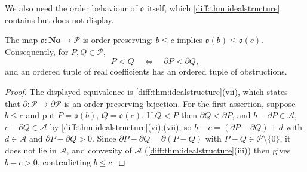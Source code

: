 \documentclass[11pt,letterpaper]{article}
\numberwithin{equation}{section}
\theoremstyle{definition}
\theoremstyle{remark}
\newcommand{\No}{\mathbf{No}}
\newcommand{\der}{\partial}
\newcommand{\Pcl}{\mathcal P}
\newcommand{\Acl}{\mathcal A}
\newcommand{\Obs}{\mathfrak o}
\begin{document}
We also need the order behaviour of $\Obs$ itself, which
\cref{diff:thm:idealstructure} contains but does not display.

\begin{corollary}
\label{diff:cor:obsorder}
The map $\Obs:\No\to\Pcl$ is order preserving: $b\leq c$ implies
$\Obs(b)\leq\Obs(c)$. Consequently, for $P,Q\in\Pcl$,
\[
 P<Q\quad\Longleftrightarrow\quad\der P<\der Q ,
\]
and an ordered tuple of real coefficients has an ordered tuple of
obstructions.
\end{corollary}
\begin{proof}
The displayed equivalence is \cref{diff:thm:idealstructure}(vii), which states
that $\der:\Pcl\to\der\Pcl$ is an order-preserving bijection. For the first
assertion, suppose $b\leq c$ and put $P=\Obs(b)$, $Q=\Obs(c)$. If $Q<P$ then
$\der Q<\der P$, and $b-\der P\in\Acl$, $c-\der Q\in\Acl$ by
\cref{diff:thm:idealstructure}(vi),(vii); so
$b-c=(\der P-\der Q)+d$ with $d\in\Acl$ and $\der P-\der Q>0$. Since
$\der P-\der Q=\der(P-Q)$ with $P-Q\in\Pcl\setminus\{0\}$, it does not lie in
$\Acl$, and convexity of $\Acl$
(\cref{diff:thm:idealstructure}(iii)) then gives $b-c>0$, contradicting
$b\leq c$.
\end{proof}
\end{document}
